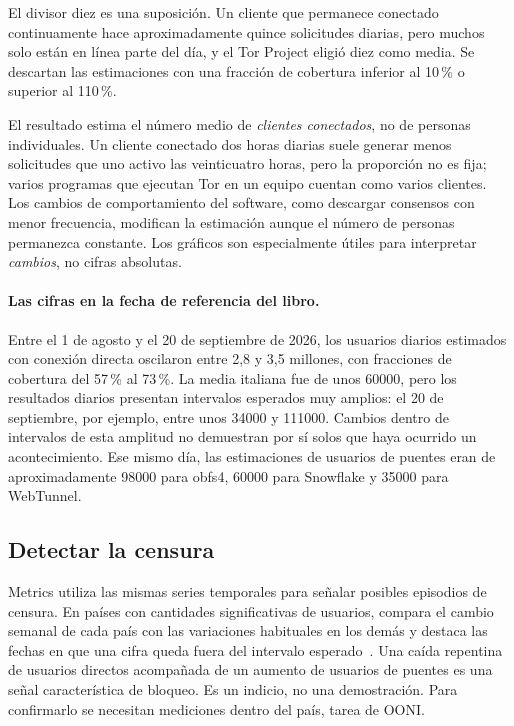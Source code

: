 El divisor diez es una suposición. Un cliente que permanece conectado continuamente hace aproximadamente quince solicitudes diarias, pero muchos solo están en línea parte del día, y el Tor Project eligió diez como media. Se descartan las estimaciones con una fracción de cobertura inferior al 10\,\% o superior al 110\,\%.

\begin{attenzione}
El resultado estima el número medio de \emph{clientes conectados}, no de personas individuales. Un cliente conectado dos horas diarias suele generar menos solicitudes que uno activo las veinticuatro horas, pero la proporción no es fija; varios programas que ejecutan Tor en un equipo cuentan como varios clientes. Los cambios de comportamiento del software, como descargar consensos con menor frecuencia, modifican la estimación aunque el número de personas permanezca constante. Los gráficos son especialmente útiles para interpretar \emph{cambios}, no cifras absolutas.
\end{attenzione}

\paragraph{Las cifras en la fecha de referencia del libro.} Entre el 1 de agosto y el 20 de septiembre de 2026, los usuarios diarios estimados con conexión directa oscilaron entre 2,8 y 3,5 millones, con fracciones de cobertura del 57\,\% al 73\,\%. La media italiana fue de unos \num{60000}, pero los resultados diarios presentan intervalos esperados muy amplios: el 20 de septiembre, por ejemplo, entre unos \num{34000} y \num{111000}. Cambios dentro de intervalos de esta amplitud no demuestran por sí solos que haya ocurrido un acontecimiento. Ese mismo día, las estimaciones de usuarios de puentes eran de aproximadamente \num{98000} para obfs4, \num{60000} para Snowflake y \num{35000} para WebTunnel.

\subsection{Detectar la censura}

Metrics utiliza las mismas series temporales para señalar posibles episodios de censura. En países con cantidades significativas de usuarios, compara el cambio semanal de cada país con las variaciones habituales en los demás y destaca las fechas en que una cifra queda fuera del intervalo esperado~\cite{metricsreproducible}. Una caída repentina de usuarios directos acompañada de un aumento de usuarios de puentes es una señal característica de bloqueo. Es un indicio, no una demostración. Para confirmarlo se necesitan mediciones dentro del país, tarea de OONI.

